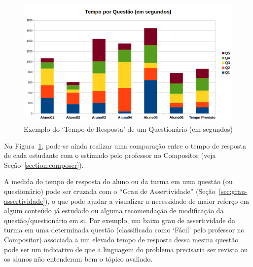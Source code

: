 \begin{figure}[ht]
	\centering
	\includegraphics[width=0.8\linewidth]{chapters/proposedMethod/exemplo_tempo_questao}
	\caption{Exemplo do `Tempo de Resposta' de um Questionário (em segundos)}
	\label{fig:exemplo_temporesposta_grafico}
\end{figure}

Na Figura~\ref{fig:exemplo_temporesposta_grafico}, pode-se ainda realizar uma comparação entre o tempo de resposta de cada estudante com o estimado pelo professor no Compositor (veja Seção~\ref{section:composer}).

A medida do tempo de resposta do aluno ou da turma em uma questão (ou questionário) pode ser cruzada com o ``Grau de Assertividade'' (Seção~\ref{sec:grau-assertividade}), o que pode ajudar a visualizar a necessidade de maior reforço em algum conteúdo já estudado ou alguma recomendação de modificação da questão/questionário em si. Por exemplo, um baixo grau de assertividade da turma em uma determinada questão (classificada como `Fácil' pelo professor no Compositor) associada a um elevado tempo de resposta dessa mesma questão pode ser um indicativo de que a linguagem do problema precisaria ser revista ou os alunos não entenderam bem o tópico avaliado.

